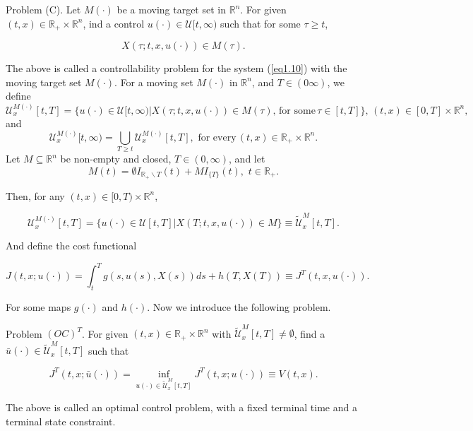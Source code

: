 Problem (C). Let $M(\cdot)$ be a moving target set in $\mathbb{R}^n$. For given 
$(t,x)\in \mathbb{R}_{+}\times \mathbb{R}^n$, ind a control $u(\cdot)\in 
\mathcal{U}[t,\infty)$ such that for some $\tau \geq t$,

$$
    X(\tau;t,x,u(\cdot))\in M(\tau).
$$

The above is called a controllability problem for the system (\ref{eq1.10}) 
with the moving target set $M(\cdot)$. For a moving set $M(\cdot)$ in 
$\mathbb{R}^n$, and $T\in (0\infty)$, we define
%
$$
    \mathcal{U}^{M(\cdot)}_x[t,T]=
        \{u(\cdot)\in \mathcal{U}[t,\infty) | X(\tau;t,x,u(\cdot))
        \in  M(\tau),\,\mbox{for some}\, \tau\in[t,T]\},\, (t,x)\in [0,T]\times 
        \mathbb{R}^n,
$$
and
%
$$
    \mathcal{U}^{M(\cdot)}_x[t,\infty)=\bigcup_{T \geq t}
    \mathcal{U}^{M(\cdot)}_x[t,T],\,\,\mbox{for every}\, 
    (t,x)
    \in
    \mathbb{R}_{+} \times \mathbb{R}^n.
$$
%
Let $M\subseteq \mathbb{R}^n$ be non-empty and closed, $T\in(0,\infty)$, and let
%
$$
    M(t)=
        \emptyset I_{\mathbb{R}_{+}
        \backslash{T}}(t)
        + MI_{\{T\}}(t),\,\, t\in \mathbb{R}_{+}.
$$

Then, for any $(t,x)\in [0,T)\times \mathbb{R}^n$,

$$\mathcal{U}^{M(\cdot)}_x[t,T]=\{u(\cdot)\in \mathcal{U}[t,T] | X(T;t,x,u(\cdot))\in M \}\equiv \tilde{\mathcal{U}}^M_x [t,T].$$

And define the cost functional

$$J(t,x;u(\cdot))=\int_{t}^{T}g(s,u(s),X(s))ds+h(T,X(T))\equiv J^T(t,x,u(\cdot)).$$

For some maps $g(\cdot)$ and $h(\cdot)$. Now we introduce the following problem.

Problem $(OC)^T$. For given $(t,x)\in \mathbb{R}_{+}\times \mathbb{R}^n$ with $\tilde{\mathcal{U}}^M_x[t,T]\neq\emptyset$, find a $\bar{u}(\cdot)\in \tilde{\mathcal{U}}^M_x[t,T]$ such that

\begin{equation*}
J^T(t,x;\bar{u}(\cdot))=\inf_{u(\cdot)\in \tilde{\mathcal{U}}^M_x[t,T]} J^T(t,x;u(\cdot))\equiv V(t,x).
\end{equation*}

The above is called an optimal control problem, with a fixed terminal time and a terminal state constraint.